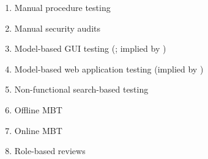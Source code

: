 \begin{enumerate}
    \item Manual procedure testing \citep[p.~47]{Firesmith2015}
    \item Manual security audits \citep[p.~28]{Gerrard2000b}
    \item Model-based GUI testing (\citealp[Tab.~1]{DoğanEtAl2014}; implied by \citealp[p.~356]{SakamotoEtAl2013})
    \item Model-based web application testing (implied by \citealp[p.~356]{SakamotoEtAl2013})
    \item Non-functional search-based testing \citep[Tab.~1]{DoğanEtAl2014}
    \item Offline MBT \citepISTQB{}
    \item Online MBT \citepISTQB{}
    \item Role-based reviews \citepISTQB{}

\end{enumerate}

